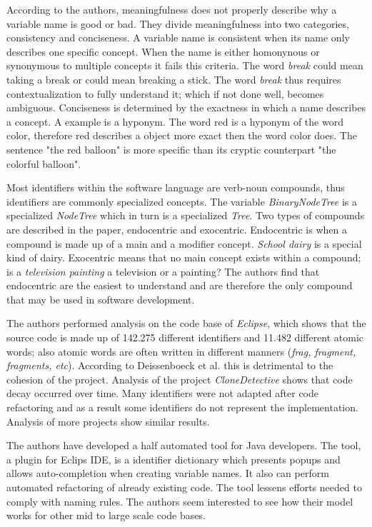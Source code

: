 \documentclass[a4paper,12pt]{article}
\begin{document}
\begin{multicols}{2}
According to the authors, meaningfulness does not properly describe why a variable name is good or bad. They divide meaningfulness into two categories, consistency and conciseness. A variable name is consistent when its name only describes one specific concept. When the name is either homonynous or synonymous to multiple concepts it fails this criteria. The word \textit{break} could mean taking a break or could mean breaking a stick. The word \textit{break} thus requires contextualization to fully understand it; which if not done well, becomes ambiguous. Conciseness is determined by the exactness in which a name describes a concept. A example is a hyponym. The word red is a hyponym of the word color, therefore red describes a object more exact then the word color does. The sentence "the red balloon" is more specific than its cryptic counterpart "the colorful balloon".

Most identifiers within the software language are verb-noun compounds, thus identifiers are commonly specialized concepts. The variable \textit{BinaryNodeTree} is a specialized \textit{NodeTree} which in turn is a specialized \textit{Tree}. Two types of compounds are described in the paper, endocentric and exocentric. Endocentric is when a compound is made up of a main and a modifier concept. \textit{School dairy} is a special kind of dairy. Exocentric means that no main concept exists within a compound; is a \textit{television painting} a television or a painting? The authors find that endocentric are the easiest to understand and are therefore the only compound that may be used in software development.

The authors performed analysis on the code base of \textit{Eclipse}, which shows that the source code is made up of 142.275 different identifiers and 11.482 different atomic words; also atomic words are often written in different manners (\textit{frag, fragment, fragments, etc}). According to Deissenboeck et al. this is detrimental to the cohesion of the project. Analysis of the project \textit{CloneDetective} shows that code decay occurred over time. Many identifiers were not adapted after code refactoring and as a result some identifiers do not represent the implementation. Analysis of more projects show similar results.

The authors have developed a half automated tool for Java developers. The tool, a plugin for Eclips IDE, is a identifier dictionary which presents popups and allows auto-completion when creating variable names. It also can perform automated refactoring of already existing code. The tool lessens efforts needed to comply with naming rules. The authors seem interested to see how their model works for other mid to large scale code bases.


\end{multicols}
\end{document}
